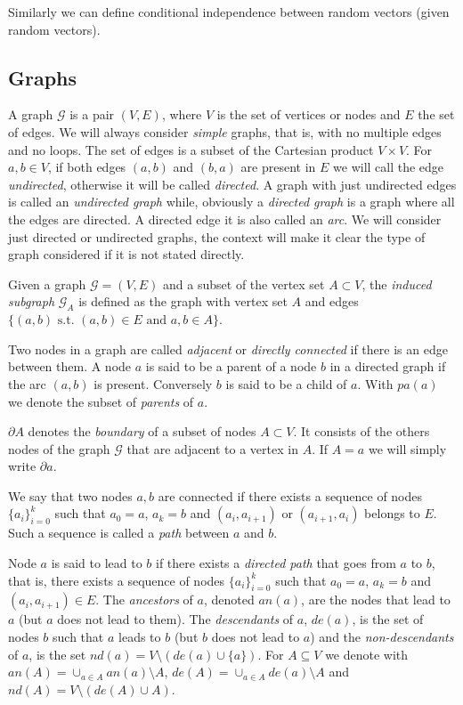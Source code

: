 \documentclass[11pt,a4paper, twoside]{book}
\begin{document}
Similarly we can define conditional independence between random vectors (given random vectors).

\subsection{Graphs}

A graph $\mathcal{G}$ is a pair $(V,E)$, where $V$ is the set of vertices or nodes and $E$ the set of edges. We will always consider \textit{simple} graphs, that is, with no multiple edges and no loops.
The set of edges is a subset of the Cartesian product $V\times V$. For $a,b \in V$, if both edges $(a,b)$ and $(b,a)$ are present in $E$ we will call the edge \textit{undirected}, otherwise it will be called \textit{directed}. A graph with just undirected edges is called an \textit{undirected graph} while, obviously a \textit{directed graph} is a graph where all the edges are directed. 
A directed edge it is also called an \textit{arc}. 
We will consider just directed or undirected graphs, the context will make it clear the type of graph considered if it is not stated directly.

Given a graph $\mathcal{G}=(V,E)$ and a subset of the vertex set $A\subset V$, the \textit{induced subgraph} $\mathcal{G}_{A}$ is defined as the graph with vertex set $A$ and edges $\{ (a,b) \text{ s.t. } (a,b) \in E \text{ and } a,b \in A \}$.

Two nodes in a graph are called \textit{adjacent} or \textit{directly connected} if there is an edge between them. A node $a$ is said to be a parent of a node $b$ in a directed graph if the arc $(a,b)$ is present. Conversely $b$ is said to be a child of $a$. With $pa(a)$ we denote the subset  of \textit{parents} of $a$. 

$\partial A$ denotes the \textit{boundary} of a subset of nodes $A \subset V$. It consists of the others nodes of the graph $\mathcal{G}$ that are adjacent to a vertex in $A$. If $A={a}$ we will simply write $\partial a$.

We say that two nodes $a,b$ are connected if there exists a sequence of nodes $\{a_i\}_{i=0}^{k}$ such that $a_0=a$, $a_k=b$ and $(a_i,a_{i+1})$ or $(a_{i+1},a_i)$ belongs to $E$. Such a sequence is called a \textit{path} between $a$ and $b$.

Node $a$ is said to lead to $b$ if there exists a \textit{directed path} that goes from $a$ to $b$, that is, there exists a sequence of nodes $\{a_i\}_{i=0}^{k}$ such that $a_0 = a$, $a_k=b$ and $(a_i,a_{i+1}) \in E$.
The \textit{ancestors} of $a$, denoted $an(a)$, are the nodes that lead to $a$ (but $a$ does not lead to them). 
The \textit{descendants} of $a$, $de(a)$, is the set of nodes $b$ such that $a$ leads to $b$ (but $b$ does not lead to $a$) and the \textit{non-descendants} of $a$, is the set $nd(a) = V \setminus (de(a) \cup \{a\})$.
For $A \subseteq V$ we denote with $an(A) = \cup_{a\in A} an(a) \setminus A$, $de(A) = \cup_{a \in A} de(a) \setminus A$ and $nd(A) = V \setminus (de(A) \cup A)$.
\end{document}
